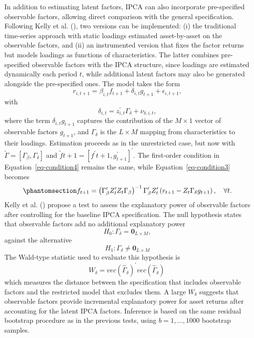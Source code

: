 \documentclass[
  12pt,
  a4paper,
  openany]{scrbook}
\begin{document}
In addition to estimating latent factors, IPCA can also incorporate
pre-specified observable factors, allowing direct comparison with the
general specification. Following Kelly et al.
(), two versions can be
implemented: (i) the traditional time-series approach with static
loadings estimated asset-by-asset on the observable factors, and (ii) an
instrumented version that fixes the factor returns but models loadings
as functions of characteristics. The latter combines pre-specified
observable factors with the IPCA structure, since loadings are estimated
dynamically each period \(t\), while additional latent factors may also
be generated alongside the pre-specified ones. The model takes the form
\[
r_{i,t+1} = \beta_{i,t}f_{t+1} + \delta_{i,t}g_{t+1} + \epsilon_{i,t+1},
\] with \[
\delta_{i,t} = z^{\prime}_{i,t}\Gamma_\delta + \nu_{\delta,i,t},
\] where the term \(\delta_{i,t} g_{t+1}\) captures the contribution of
the \(M \times 1\) vector of observable factors \(g_{t+1}\), and
\(\Gamma_\delta\) is the \(L \times M\) mapping from characteristics to
their loadings. Estimation proceeds as in the unrestricted case, but now
with \(\tilde\Gamma = [\Gamma_\beta, \Gamma_\delta]\) and
\(\tilde{f}{t+1} = [f^{\prime}{t+1}, g^{\prime}_{t+1}]^\prime\). The
first-order condition in Equation~\ref{eq-condition4} remains the same,
while Equation~\ref{eq-condition3} becomes
\begin{equation}\phantomsection\label{eq-condition5}{
f_{t+1} = \left(\Gamma_\beta^{\prime} Z_t^{\prime} Z_t \Gamma_\beta \right)^{-1} \Gamma_\beta^{\prime} Z_t^{\prime} \left(r_{t+1} - Z_t \Gamma_\delta g_{t+1} \right), \quad \forall t. 
}\end{equation} Kelly et al.
() propose a test to
assess the explanatory power of observable factors after controlling for
the baseline IPCA specification. The null hypothesis states that
observable factors add no additional explanatory power \[
H_0:\Gamma_\delta = \mathbf{0}_{L \times M}, 
\] against the alternative
\[H_1:\Gamma_\delta \neq \mathbf{0}_{L \times M}\] The Wald-type
statistic used to evaluate this hypothesis is \[
W_{\delta} = vec(\hat\Gamma_{\delta})^\prime vec(\hat\Gamma_{\delta})\
\] which measures the distance between the specification that includes
observable factors and the restricted model that excludes them. A large
\(W_\delta\) suggests that observable factors provide incremental
explanatory power for asset returns after accounting for the latent IPCA
factors. Inference is based on the same residual bootstrap procedure as
in the previous tests, using \(b=1,\dots,1000\) bootstrap samples.
\end{document}
